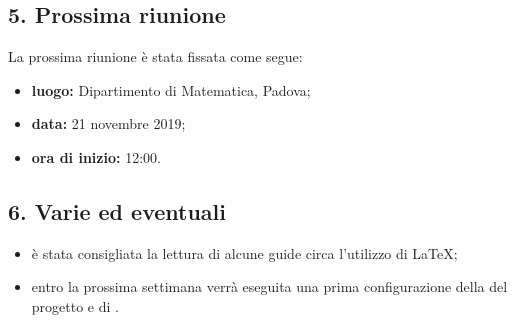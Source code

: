 \subsection*{5. Prossima riunione}

La prossima riunione è stata fissata come segue:
\begin{itemize}
	\item \textbf{luogo:} Dipartimento di Matematica, Padova;
	\item \textbf{data:} 21 novembre 2019;
	\item \textbf{ora di inizio:} 12:00.
\end{itemize}


\subsection*{6. Varie ed eventuali}

\begin{itemize}

	\item è stata consigliata la lettura di alcune guide circa l'utilizzo di \LaTeX{};
	\item entro la prossima settimana verrà eseguita una prima configurazione della  del progetto e di .
\end{itemize}


